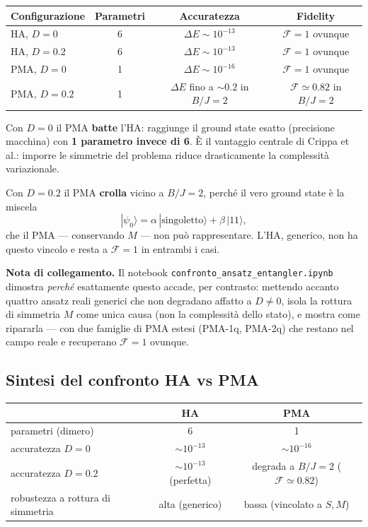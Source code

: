 \documentclass[11pt,a4paper]{article}
\begin{document}
\begin{center}
\renewcommand{\arraystretch}{1.3}
\begin{tabular}{@{}lccc@{}}
\toprule
\rowcolor{inkblue!10}
\textbf{Configurazione} & \textbf{Parametri} & \textbf{Accuratezza} & \textbf{Fidelity}\\
\midrule
HA, $D=0$   & 6 & $\Delta E\sim10^{-13}$ & $\mathcal F=1$ ovunque\\
HA, $D=0.2$ & 6 & $\Delta E\sim10^{-13}$ & $\mathcal F=1$ ovunque\\
PMA, $D=0$  & 1 & $\Delta E\sim10^{-16}$ & $\mathcal F=1$ ovunque\\
PMA, $D=0.2$& 1 & $\Delta E$ fino a $\sim0.2$ in $B/J{=}2$ & $\mathcal F\simeq0.82$ in $B/J{=}2$\\
\bottomrule
\end{tabular}
\end{center}

Con $D=0$ il PMA \textbf{batte} l'HA: raggiunge il ground state esatto
(precisione macchina) con \textbf{1 parametro invece di 6}. È il
vantaggio centrale di Crippa et al.: imporre le simmetrie del problema
riduce drasticamente la complessità variazionale.

Con $D=0.2$ il PMA \textbf{crolla} vicino a $B/J=2$, perché il vero
ground state è la miscela
$$|\psi_0\rangle = \alpha\,|\text{singoletto}\rangle + \beta\,|11\rangle,$$
che il PMA --- conservando $M$ --- non può rappresentare. L'HA,
generico, non ha questo vincolo e resta a $\mathcal F=1$ in entrambi i
casi.

\begin{keyeq}
\textbf{Nota di collegamento.} Il notebook
\texttt{confronto\_ansatz\_entangler.ipynb} dimostra \emph{perché}
esattamente questo accade, per contrasto: mettendo accanto quattro
ansatz reali generici che non degradano affatto a $D\neq0$, isola la
rottura di simmetria $M$ come unica causa (non la complessità dello
stato), e mostra come ripararla --- con due famiglie di PMA estesi
(PMA-1q, PMA-2q) che restano nel campo reale e recuperano
$\mathcal F=1$ ovunque.
\end{keyeq}

\subsection*{Sintesi del confronto HA vs PMA}

\begin{center}
\renewcommand{\arraystretch}{1.3}
\begin{tabular}{@{}lcc@{}}
\toprule
\rowcolor{inkblue!10}
 & \textbf{HA} & \textbf{PMA}\\
\midrule
parametri (dimero) & 6 & 1\\
accuratezza $D=0$ & $\sim10^{-13}$ & $\sim10^{-16}$\\
accuratezza $D=0.2$ & $\sim10^{-13}$ (perfetta) & degrada a $B/J{=}2$ ($\mathcal F\simeq0.82$)\\
robustezza a rottura di simmetria & alta (generico) & bassa (vincolato a $S,M$)\\
\bottomrule
\end{tabular}
\end{center}
\end{document}
